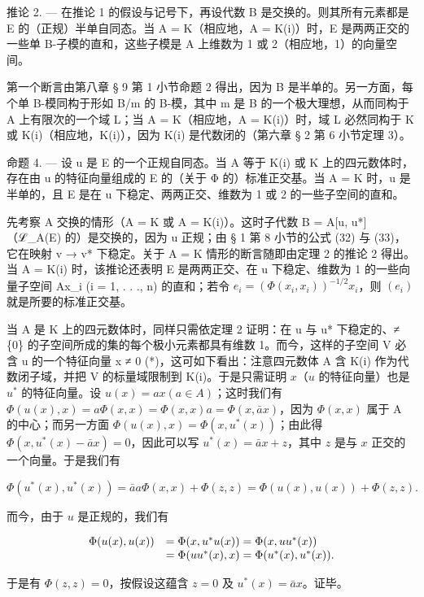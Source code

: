 推论 2. --- 在推论 1 的假设与记号下，再设代数 B 是交换的。则其所有元素都是 E 的（正规）半单自同态。当 A = K（相应地，A = K(i)）时，E 是两两正交的一些单 B-子模的直和，这些子模是 A 上维数为 1 或 2（相应地，1）的向量空间。

第一个断言由第八章 § 9 第 1 小节命题 2 得出，因为 B 是半单的。另一方面，每个单 B-模同构于形如 B/m 的 B-模，其中 m 是 B 的一个极大理想，从而同构于 A 上有限次的一个域 L；当 A = K（相应地，A = K(i)）时，域 L 必然同构于 K 或 K(i)（相应地，K(i)），因为 K(i) 是代数闭的（第六章 § 2 第 6 小节定理 3）。

命题 4. --- 设 u 是 E 的一个正规自同态。当 A 等于 K(i) 或 K 上的四元数体时，存在由 u 的特征向量组成的 E 的（关于 Φ 的）标准正交基。当 A = K 时，u 是半单的，且 E 是在 u 下稳定、两两正交、维数为 1 或 2 的一些子空间的直和。

先考察 A 交换的情形（A = K 或 A = K(i)）。这时子代数 B = A{[}u, u*{]}（ℒ\_A(E) 的）是交换的，因为 u 正规；由 § 1 第 8 小节的公式 (32) 与 (33)，它在映射 v → v* 下稳定。关于 A = K 情形的断言随即由定理 2 的推论 2 得出。当 A = K(i) 时，该推论还表明 E 是两两正交、在 u 下稳定、维数为 1 的一些向量子空间 Ax\_i (i = 1, . . ., n) 的直和；若令 \(e_{i} = (\Phi(x_{i}, x_{i}))^{-1/2}x_{i}\)，则 \((e_{i})\) 就是所要的标准正交基。

当 A 是 K 上的四元数体时，同样只需依定理 2 证明：在 u 与 u* 下稳定的、≠ \{0\} 的子空间所成的集的每个极小元素都具有维数 1。而今，这样的子空间 V 必含 u 的一个特征向量 x ≠ 0 (*)，这可如下看出：注意四元数体 A 含 K(i) 作为代数闭子域，并把 V 的标量域限制到 K(i)。于是只需证明 \(x\)（\(u\) 的特征向量）也是 \(u^{*}\) 的特征向量。设 \(u(x) = ax (a \in A)\)；这时我们有 \(\Phi(u(x), x) = a\Phi(x, x) = \Phi(x, x)a = \Phi(x, \bar{a}x)\)，因为 \(\Phi(x, x)\) 属于 A 的中心；而另一方面 \(\Phi(u(x), x) = \Phi(x, u^*(x))\)；由此得 \(\Phi(x, u^*(x) - \bar{a}x) = 0\)，因此可以写 \(u^*(x) = \bar{a}x + z\)，其中 \(z\) 是与 \(x\) 正交的一个向量。于是我们有

\[
\Phi (u ^ {*} (x), u ^ {*} (x)) = \bar {a} a \Phi (x, x) + \Phi (z, z) = \Phi (u (x), u (x)) + \Phi (z, z).
\]

而今，由于 \(u\) 是正规的，我们有

\[
\begin{array}{r l} \Phi (u (x), u (x)) & = \Phi (x, u ^ {*} u (x)) = \Phi (x, u u ^ {*} (x)) \\ & = \Phi (u u ^ {*} (x), x) = \Phi (u ^ {*} (x), u ^ {*} (x)). \end{array}
\]

于是有 \(\Phi(z, z) = 0\)，按假设这蕴含 \(z = 0\) 及 \(u^{*}(x) = \bar{a}x\)。证毕。

